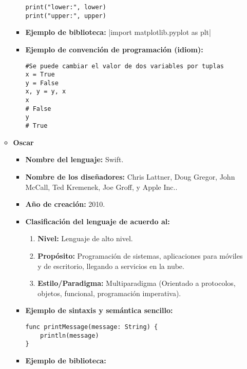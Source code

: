 \documentclass[11pt,letterpaper]{article}
\begin{document}
\begin{enumerate}
\begin{itemize}
\begin{itemize}
\begin{verbatim}
print("lower:", lower)
print("upper:", upper)
\end{verbatim}
                  \item \textbf{Ejemplo de biblioteca:}
                  |import matplotlib.pyplot as plt|

                  \item \textbf{Ejemplo de convención de programación (idiom):}
\begin{verbatim}
#Se puede cambiar el valor de dos variables por tuplas
x = True
y = False
x, y = y, x
x
# False
y
# True
\end{verbatim}
                \end{itemize}

          \item \textbf{Oscar}
                \begin{itemize}
                  \item \textbf{Nombre del lenguaje:} Swift.
                  \item \textbf{Nombre de los diseñadores:} Chris Lattner, Doug
                        Gregor, John McCall, Ted Kremenek, Joe Groff, y Apple
                        Inc..
                  \item \textbf{Año de creación:} 2010.
                  \item \textbf{Clasificación del lenguaje de acuerdo al:}
                        \begin{enumerate}
                          \item \textbf{Nivel:} Lenguaje de alto nivel.
                          \item \textbf{Propósito:} Programación de sistemas,
                                aplicaciones para móviles y de escritorio,
                                llegando a servicios en la nube.
                          \item \textbf{Estilo/Paradigma:} Multiparadigma
                                (Orientado a protocolos, objetos, funcional,
                                programación imperativa).
                        \end{enumerate}
                  \item \textbf{Ejemplo de sintaxis y semántica sencillo:}
\begin{verbatim}
func printMessage(message: String) {
    println(message)
}
\end{verbatim}
                  \item \textbf{Ejemplo de biblioteca:}

\end{itemize}
\end{itemize}
\end{enumerate}
\end{document}

